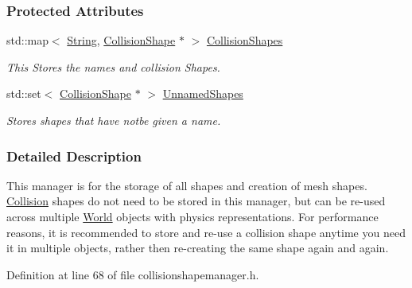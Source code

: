 \subsubsection*{Protected Attributes}
\begin{DoxyCompactItemize}
\item 
\hypertarget{classMezzanine_1_1CollisionShapeManager_abbb1fe3fe33590c524d9b43629530171}{
std::map$<$ \hyperlink{namespaceMezzanine_acf9fcc130e6ebf08e3d8491aebcf1c86}{String}, \hyperlink{classMezzanine_1_1CollisionShape}{CollisionShape} $\ast$ $>$ \hyperlink{classMezzanine_1_1CollisionShapeManager_abbb1fe3fe33590c524d9b43629530171}{CollisionShapes}}
\label{classMezzanine_1_1CollisionShapeManager_abbb1fe3fe33590c524d9b43629530171}

\begin{DoxyCompactList}\small\item\em This Stores the names and collision Shapes. \item\end{DoxyCompactList}\item 
\hypertarget{classMezzanine_1_1CollisionShapeManager_ab54d750482b016f93b2800323592e779}{
std::set$<$ \hyperlink{classMezzanine_1_1CollisionShape}{CollisionShape} $\ast$ $>$ \hyperlink{classMezzanine_1_1CollisionShapeManager_ab54d750482b016f93b2800323592e779}{UnnamedShapes}}
\label{classMezzanine_1_1CollisionShapeManager_ab54d750482b016f93b2800323592e779}

\begin{DoxyCompactList}\small\item\em Stores shapes that have notbe given a name. \item\end{DoxyCompactList}\end{DoxyCompactItemize}


\subsubsection{Detailed Description}
This manager is for the storage of all shapes and creation of mesh shapes. \hyperlink{classMezzanine_1_1Collision}{Collision} shapes do not need to be stored in this manager, but can be re-\/used across multiple \hyperlink{classMezzanine_1_1World}{World} objects with physics representations. For performance reasons, it is recommended to store and re-\/use a collision shape anytime you need it in multiple objects, rather then re-\/creating the same shape again and again. 

Definition at line 68 of file collisionshapemanager.h.



